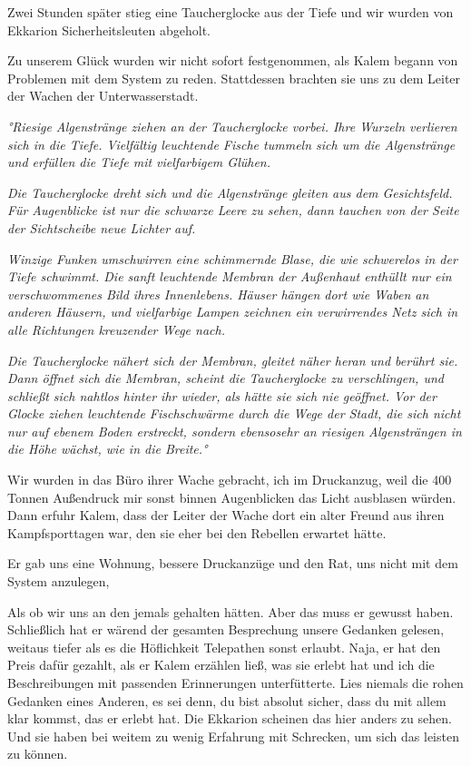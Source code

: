 \documentclass[11pt]{article}
\begin{document}
Zwei Stunden später stieg eine Taucherglocke aus der Tiefe und wir
wurden von Ekkarion Sicherheitsleuten abgeholt.

Zu unserem Glück wurden wir nicht sofort festgenommen, als Kalem begann
von Problemen mit dem System zu reden. Stattdessen brachten sie uns zu
dem Leiter der Wachen der Unterwasserstadt.

\emph{°Riesige Algenstränge ziehen an der Taucherglocke vorbei. Ihre
Wurzeln verlieren sich in die Tiefe. Vielfältig leuchtende Fische
tummeln sich um die Algenstränge und erfüllen die Tiefe mit vielfarbigem
Glühen.}

\emph{Die Taucherglocke dreht sich und die Algenstränge gleiten aus dem
Gesichtsfeld. Für Augenblicke ist nur die schwarze Leere zu sehen, dann
tauchen von der Seite der Sichtscheibe neue Lichter auf.}

\emph{Winzige Funken umschwirren eine schimmernde Blase, die wie
schwerelos in der Tiefe schwimmt. Die sanft leuchtende Membran der
Außenhaut enthüllt nur ein verschwommenes Bild ihres Innenlebens. Häuser
hängen dort wie Waben an anderen Häusern, und vielfarbige Lampen
zeichnen ein verwirrendes Netz sich in alle Richtungen kreuzender Wege
nach.}

\emph{Die Taucherglocke nähert sich der Membran, gleitet näher heran und
berührt sie. Dann öffnet sich die Membran, scheint die Taucherglocke zu
verschlingen, und schließt sich nahtlos hinter ihr wieder, als hätte sie
sich nie geöffnet. Vor der Glocke ziehen leuchtende Fischschwärme durch
die Wege der Stadt, die sich nicht nur auf ebenem Boden erstreckt,
sondern ebensosehr an riesigen Algensträngen in die Höhe wächst, wie in
die Breite.°}

Wir wurden in das Büro ihrer Wache gebracht, ich im Druckanzug, weil die
400 Tonnen Außendruck mir sonst binnen Augenblicken das Licht ausblasen
würden. Dann erfuhr Kalem, dass der Leiter der Wache dort ein alter
Freund aus ihren Kampfsporttagen war, den sie eher bei den Rebellen
erwartet hätte.

Er gab uns eine Wohnung, bessere Druckanzüge und den Rat, uns nicht mit
dem System anzulegen,

Als ob wir uns an den jemals gehalten hätten. Aber das muss er gewusst
haben. Schließlich hat er wärend der gesamten Besprechung unsere
Gedanken gelesen, weitaus tiefer als es die Höflichkeit Telepathen sonst
erlaubt. Naja, er hat den Preis dafür gezahlt, als er Kalem erzählen
ließ, was sie erlebt hat und ich die Beschreibungen mit passenden
Erinnerungen unterfütterte. Lies niemals die rohen Gedanken eines
Anderen, es sei denn, du bist absolut sicher, dass du mit allem klar
kommst, das er erlebt hat. Die Ekkarion scheinen das hier anders zu
sehen. Und sie haben bei weitem zu wenig Erfahrung mit Schrecken, um
sich das leisten zu können.
\end{document}

